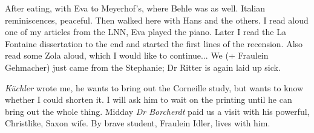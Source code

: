 After eating, with Eva to Meyerhof's, where Behle was as well. Italian reminiscences, peaceful. Then walked here with Hans and the others. I read aloud one of my articles from the LNN, Eva played the piano. Later I read the La Fontaine dissertation to the end and started the first lines of the recension. Also read some Zola aloud, which I would like to continue... We (+ Fraulein Gehmacher) just came from the Stephanie; Dr Ritter is again laid up sick. 

\textit{Küchler} wrote me, he wants to bring out the Corneille study, but wants to know whether I could shorten it. I will ask him to wait on the printing until he can bring out the whole thing. Midday \textit{Dr Borcherdt} paid us a visit with his powerful, Christlike, Saxon wife. By brave student, Fraulein Idler, lives with him.


